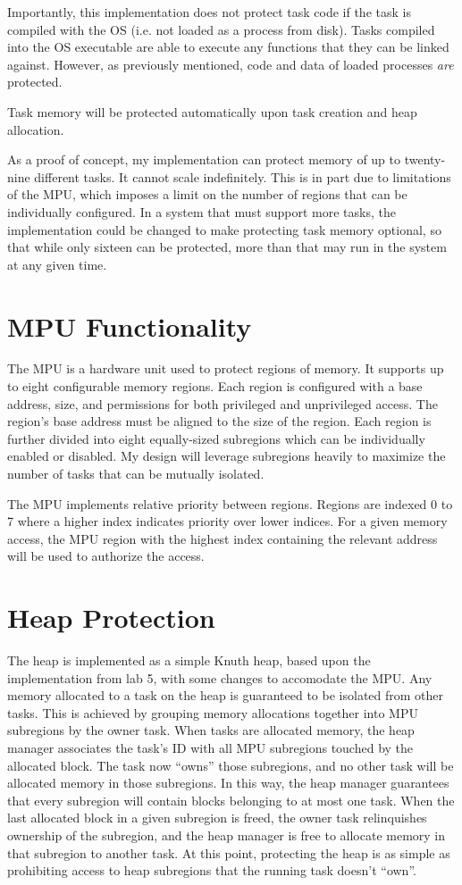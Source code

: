 Importantly, this implementation does not protect task code if the task is compiled with the OS (i.e. not loaded as a process from disk). Tasks compiled into the OS executable are able to execute any functions that they can be linked against. However, as previously mentioned, code and data of loaded processes \textit{are} protected.

Task memory will be protected automatically upon task creation and heap allocation.

As a proof of concept, my implementation can protect memory of up to twenty-nine different tasks. It cannot scale indefinitely. This is in part due to limitations of the MPU, which imposes a limit on the number of regions that can be individually configured. In a system that must support more tasks, the implementation could be changed to make protecting task memory optional, so that while only sixteen can be protected, more than that may run in the system at any given time.

\section{MPU Functionality}

The MPU is a hardware unit used to protect regions of memory. It supports up to eight configurable memory regions. Each region is configured with a base address, size, and permissions for both privileged and unprivileged access. The region's base address must be aligned to the size of the region. Each region is further divided into eight equally-sized subregions which can be individually enabled or disabled. My design will leverage subregions heavily to maximize the number of tasks that can be mutually isolated.

The MPU implements relative priority between regions. Regions are indexed 0 to 7 where a higher index indicates priority over lower indices. For a given memory access, the MPU region with the highest index containing the relevant address will be used to authorize the access.

\section{Heap Protection}

The heap is implemented as a simple Knuth heap, based upon the implementation from lab 5, with some changes to accomodate the MPU. Any memory allocated to a task on the heap is guaranteed to be isolated from other tasks. This is achieved by grouping memory allocations together into MPU subregions by the owner task. When tasks are allocated memory, the heap manager associates the task's ID with all MPU subregions touched by the allocated block. The task now ``owns'' those subregions, and no other task will be allocated memory in those subregions. In this way, the heap manager guarantees that every subregion will contain blocks belonging to at most one task. When the last allocated block in a given subregion is freed, the owner task relinquishes ownership of the subregion, and the heap manager is free to allocate memory in that subregion to another task. At this point, protecting the heap is as simple as prohibiting access to heap subregions that the running task doesn't ``own''.

